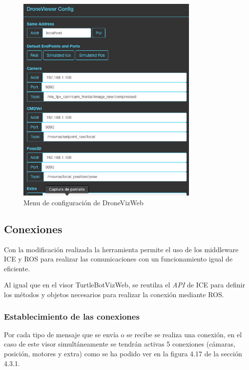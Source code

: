 \begin{figure}[H]
  \begin{center}
    \includegraphics[width=0.8\textwidth]{figures/configdroneviz.png}
		\caption{Menu de configuración de DroneVizWeb}
		\label{fig.configdroneviz}
		\end{center}
\end{figure}

\subsection{Conexiones}

Con la modificación realizada la herramienta permite el uso de los middleware ICE y ROS para realizar las comunicaciones con un funcionamiento igual de eficiente.

Al igual que en el visor TurtleBotVizWeb, se reutilza el \textit{API} de ICE para definir los métodos y objetos necesarios para realizar la conexión mediante ROS.

\subsubsection{Establecimiento de las conexiones}

Por cada tipo de mensaje que se envía o se recibe se realiza una conexión, en el caso de este visor simultáneamente se tendrán activas 5 conexiones (cámaras, posición, motores y extra) como se ha podido ver en la figura 4.17 de la sección 4.3.1.

